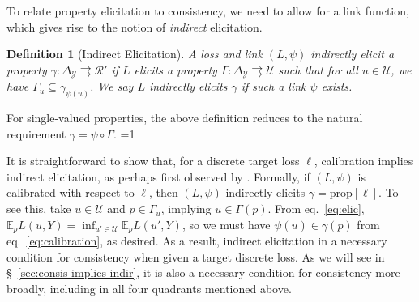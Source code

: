 \documentclass{article}
\newcommand{\Comments}{1}
\newcommand{\mytodo}[2]{\ifnum\Comments=1%
	\todo[linecolor=#1!80!black,backgroundcolor=#1,bordercolor=#1!80!black]{#2}\fi}
\newcommand{\raft}[1]{\mytodo{green!20!white}{RF: #1}}
\newcommand{\btw}[1]{\mytodo{gray!10!white}{\textcolor{gray}{BTW: #1}}}%
\newcommand{\simplex}{\Delta_\Y}
\newcommand{\prop}[1]{\mathrm{prop}[#1]}
\newcommand{\E}{\mathbb{E}}
\newcommand{\R}{\mathcal{R}}
\newcommand{\U}{\mathcal{U}}
\newcommand{\Y}{\mathcal{Y}}
\newcommand{\exploss}[3]{\E_{#3} #1(#2,Y)}
\newcommand{\toto}{\rightrightarrows}
\newtheorem{definition}{Definition}
\begin{document}
To relate property elicitation to consistency, we need to allow for a link function, which gives rise to the notion of \emph{indirect} elicitation.
\begin{definition}[Indirect Elicitation]\label{def:indirectly-elicits}
	A loss and link $(L, \psi)$ \emph{indirectly elicit} a property $\gamma:\simplex \toto \R'$ if $L$ elicits a property $\Gamma: \simplex \toto \U$ such that for all $u \in \U$, we have $\Gamma_u \subseteq \gamma_{\psi(u)}$.
	We say $L$ \emph{indirectly elicits} $\gamma$ if such a link $\psi$ exists.
\end{definition}
For single-valued properties, the above definition reduces to the natural requirement $\gamma = \psi \circ \Gamma$.
\btw{interesting discussion of set-valued properties commented out; revive later!}

It is straightforward to show that, for a discrete target loss $\ell$, calibration implies indirect elicitation, as perhaps first observed by \citet{agarwal2015consistent}.
Formally, if $(L,\psi)$ is calibrated with respect to $\ell$, then $(L,\psi)$ indirectly elicits $\gamma = \prop{\ell}$.
To see this, take $u\in\U$ and $p\in\Gamma_u$, implying $u\in\Gamma(p)$.
From eq.~\eqref{eq:elic}, $\exploss{L}{u}{p} = \inf_{u'\in\U} \exploss{L}{u'}{p}$, so we must have $\psi(u) \in \gamma(p)$ from eq.~\eqref{eq:calibration}, as desired.
As a result, indirect elicitation in a necessary condition for consistency when given a target discrete loss.
As we will see in \S~\ref{sec:consis-implies-indir}, it is also a necessary condition for consistency more broadly, including in all four quadrants mentioned above.
\end{document}
